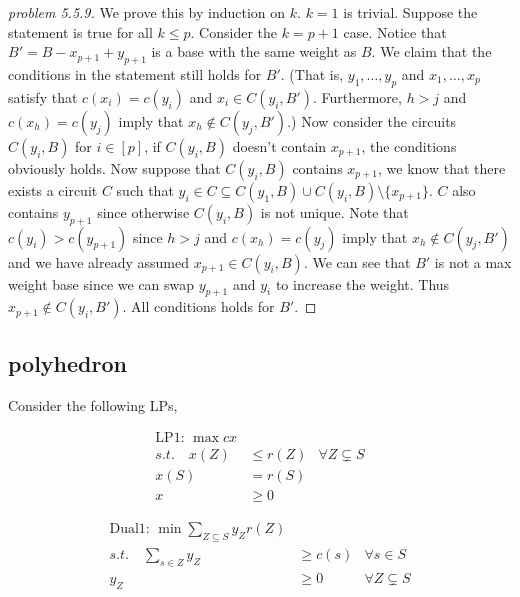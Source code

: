 \documentclass[12pt]{article}
\begin{document}
\begin{proof}[problem 5.5.9]
    We prove this by induction on $k$. $k=1$ is trivial. Suppose the statement is true for all $k\leq p$. Consider the $k=p+1$ case. Notice that $B'=B-x_{p+1}+y_{p+1}$ is a base with the same weight as $B$. We claim that the conditions in the statement still holds for $B'$.
    (That is, $y_1,\dots,y_{p}$ and $x_1,\dots,x_{p}$ satisfy that $c(x_i)=c(y_i)$ and $x_i\in C(y_i,B')$. Furthermore, $h>j$ and $c(x_h)=c(y_j)$ imply that $x_h \notin C(y_j,B')$.)
    Now consider the circuits $C(y_i,B)$ for $i\in [p]$, if $C(y_i,B)$ doesn't contain $x_{p+1}$, the conditions obviously holds. Now suppose that $C(y_i,B)$ contains $x_{p+1}$, we know that there exists a circuit $C$ such that  $y_i\in C\subseteq C(y_1,B)\cup C(y_i,B)\setminus \{x_{p+1}\}$. $C$ also contains $y_{p+1}$ since otherwise $C(y_i,B)$ is not unique. Note that $c(y_i)>c(y_{p+1})$ since $h>j$ and $c(x_h)=c(y_j)$ imply that $x_h \notin C(y_j,B')$ and we have already assumed $x_{p+1}\in C(y_i,B)$.
    We can see that $B'$ is not a max weight base since we can swap $y_{p+1}$ and $y_i$ to increase the weight. Thus $x_{p+1}\notin C(y_i,B')$. All conditions holds for $B'$.
\end{proof}

\subsection{polyhedron}

Consider the following LPs,

\begin{minipage}{.45\textwidth}
\begin{align*}
    \text{LP1: } \max  cx\\
    s.t. \quad x(Z)&\leq r(Z) &\forall Z \subsetneq S\\
                x(S)&=r(S) \\
                x&\geq 0
\end{align*}
\end{minipage}
\begin{minipage}{.45\textwidth}
\begin{align*}
    \text{Dual1: } \min \sum_{Z\subseteq S} y_Z r(Z)\\
    s.t. \quad \sum_{s\in Z}y_Z&\geq c(s) & \forall s\in S\\
    y_Z&\geq 0 & \forall Z\subsetneq S
\end{align*}
\end{minipage}
\end{document}
